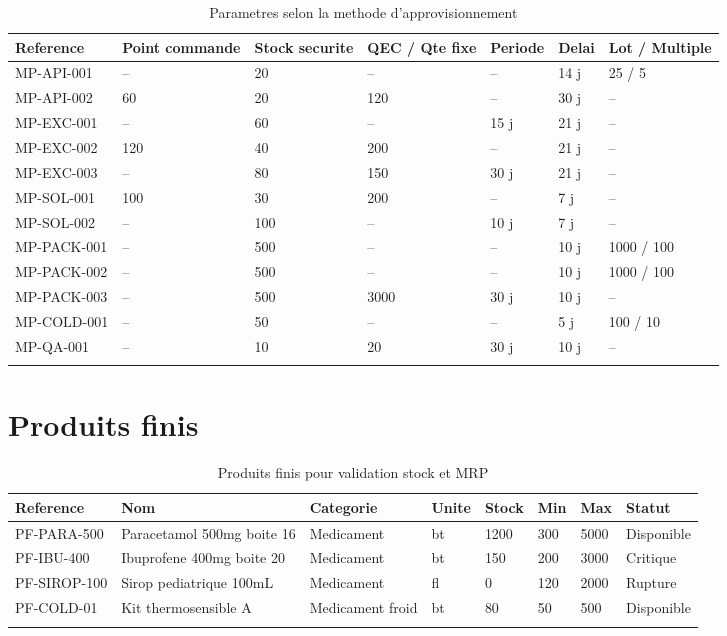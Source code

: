 \documentclass[11pt,a4paper]{article}
\begin{document}
\begin{longtable}{|p{2.4cm}|p{2cm}|p{2cm}|p{2cm}|p{2cm}|p{2cm}|p{2cm}|}
\hline
\textbf{Reference} & \textbf{Point commande} & \textbf{Stock securite} & \textbf{QEC / Qte fixe} & \textbf{Periode} & \textbf{Delai} & \textbf{Lot / Multiple} \\
\hline
MP-API-001 & -- & 20 & -- & -- & 14 j & 25 / 5 \\
\hline
MP-API-002 & 60 & 20 & 120 & -- & 30 j & -- \\
\hline
MP-EXC-001 & -- & 60 & -- & 15 j & 21 j & -- \\
\hline
MP-EXC-002 & 120 & 40 & 200 & -- & 21 j & -- \\
\hline
MP-EXC-003 & -- & 80 & 150 & 30 j & 21 j & -- \\
\hline
MP-SOL-001 & 100 & 30 & 200 & -- & 7 j & -- \\
\hline
MP-SOL-002 & -- & 100 & -- & 10 j & 7 j & -- \\
\hline
MP-PACK-001 & -- & 500 & -- & -- & 10 j & 1000 / 100 \\
\hline
MP-PACK-002 & -- & 500 & -- & -- & 10 j & 1000 / 100 \\
\hline
MP-PACK-003 & -- & 500 & 3000 & 30 j & 10 j & -- \\
\hline
MP-COLD-001 & -- & 50 & -- & -- & 5 j & 100 / 10 \\
\hline
MP-QA-001 & -- & 10 & 20 & 30 j & 10 j & -- \\
\hline
\caption{Parametres selon la methode d'approvisionnement}
\end{longtable}

\section{Produits finis}

\begin{longtable}{|p{2.4cm}|p{4cm}|p{2.5cm}|p{1.2cm}|p{1.6cm}|p{1.6cm}|p{1.6cm}|p{2cm}|}
\hline
\textbf{Reference} & \textbf{Nom} & \textbf{Categorie} & \textbf{Unite} & \textbf{Stock} & \textbf{Min} & \textbf{Max} & \textbf{Statut} \\
\hline
PF-PARA-500 & Paracetamol 500mg boite 16 & Medicament & bt & 1200 & 300 & 5000 & Disponible \\
\hline
PF-IBU-400 & Ibuprofene 400mg boite 20 & Medicament & bt & 150 & 200 & 3000 & Critique \\
\hline
PF-SIROP-100 & Sirop pediatrique 100mL & Medicament & fl & 0 & 120 & 2000 & Rupture \\
\hline
PF-COLD-01 & Kit thermosensible A & Medicament froid & bt & 80 & 50 & 500 & Disponible \\
\hline
\caption{Produits finis pour validation stock et MRP}
\end{longtable}
\end{document}
